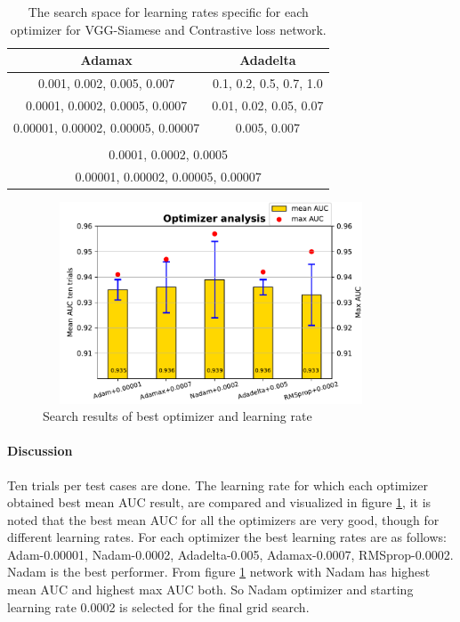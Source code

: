 \begin{table}[ht]
 \centering
 \caption{The search space for learning rates specific for each optimizer for VGG-Siamese and Contrastive loss network.}
 \begin{tabular}{|c| c|} 
 \hline\hline 
 \rowcolor{lightgrey}
 Adamax & Adadelta\\ [0.5ex] 
 \hline
 0.001, 0.002, 0.005, 0.007 & 0.1, 0.2, 0.5, 0.7, 1.0 \\
 0.0001, 0.0002, 0.0005, 0.0007 & 0.01, 0.02, 0.05, 0.07\\
 0.00001, 0.00002, 0.00005, 0.00007 & 0.005, 0.007\\
 \hline
 \rowcolor{lightgrey}
 \multicolumn{2}{|c|}{Adam, Nadam and RMSprop} \\[0.5ex] 
 \hline
 \multicolumn{2}{|c|}{0.0001, 0.0002, 0.0005}\\
 \multicolumn{2}{|c|}{0.00001, 0.00002, 0.00005, 0.00007}\\
 \hline \hline
\end{tabular}
\label{table:search_space_lr_contrastive}
\end{table}

\begin{figure}[ht]
\centering
\includegraphics[width=10cm,height= 6cm]{images/contrastive/contrastive_loss_optimizer_bar}
\caption{Search results of best optimizer and learning rate}
\label{fig:contrastive_loss_optimizer_bar}
\end{figure}

\paragraph{Discussion\\} 
Ten trials per test cases are done. The learning rate for which each optimizer obtained best mean AUC result, are compared and visualized in figure \ref{fig:contrastive_loss_optimizer_bar}, it is noted that the best mean AUC for all the 
optimizers are very good, though for different learning rates. 
For each optimizer the best learning rates are as follows: Adam-0.00001, Nadam-0.0002, Adadelta-0.005, Adamax-0.0007, RMSprop-0.0002. Nadam is the best performer.
From figure \ref{fig:contrastive_loss_optimizer_bar} network with Nadam has highest mean AUC and highest max AUC both. So Nadam optimizer and starting learning rate 0.0002 is selected for the final grid search.


